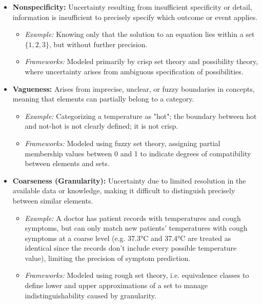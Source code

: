 \begin{itemize}
    \item \textbf{Nonspecificity:} Uncertainty resulting from insufficient specificity or detail, information is insufficient to precisely specify which outcome or event applies.
    \begin{itemize}
        \item \textit{Example:} Knowing only that the solution to an equation lies within a set \(\{1, 2, 3\}\), but without further precision.
        \item \textit{Frameworks:} Modeled primarily by crisp set theory and possibility theory, where uncertainty arises from ambiguous specification of possibilities.
    \end{itemize}

    \item \textbf{Vagueness:} Arises from imprecise, unclear, or fuzzy boundaries in concepts, meaning that elements can partially belong to a category. 
    \begin{itemize}
        \item \textit{Example:} Categorizing a temperature as "hot"; the boundary between hot and not-hot is not clearly defined; it is not crisp.
        \item \textit{Frameworks:} Modeled using fuzzy set theory, assigning partial membership values between 0 and 1 to indicate degrees of compatibility between elements and sets.
    \end{itemize}

    \item \textbf{Coarseness (Granularity):} Uncertainty due to limited resolution in the available data or knowledge, making it difficult to distinguish precisely between similar elements.
    \begin{itemize}
        \item \textit{Example:} A doctor has patient records with temperatures and cough symptoms, but can only match new patients' temperatures with cough symptoms at a coarse level (e.g. 37.3°C and 37.4°C are treated as identical since the records don't include every possible temperature value), limiting the precision of symptom prediction.
        \item \textit{Frameworks:} Modeled using rough set theory, i.e. equivalence classes to define lower and upper approximations of a set to manage indistinguishability caused by granularity.
    \end{itemize}


\end{itemize}
